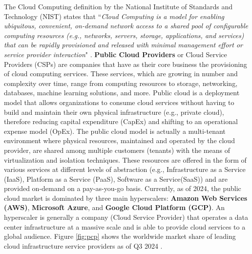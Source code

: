 The Cloud Computing definition by the National Institute of Standards and Technology (NIST) \cite{nist_cloud_computing} states that ``\textit{Cloud Computing is a model for enabling ubiquitous, convenient, on-demand network access to a shared pool of configurable computing resources (e.g., networks, servers, storage, applications, and services) that can be rapidly provisioned and released with minimal management effort or service provider interaction}" \cite{nist_cloud_computing}.
\textbf{Public Cloud Providers} or Cloud Service Providers (CSPs) are companies that have as their core business the provisioning of cloud computing services. 
These services, which are growing in number and complexity over time, range from computing resources to storage, networking, databases, machine learning solutions, and more. 
Public cloud is a deployment model that allows organizations to consume cloud services without having to build and maintain their own physical infrastructure (e.g., private cloud), therefore reducing capital expenditure (CapEx) and shifting to an operational expense model (OpEx). 
The public cloud model is actually a multi-tenant environment where physical resources, maintained and operated by the cloud provider, are shared among multiple customers (tenants) with the means of virtualization and isolation techniques.
These resources are offered in the form of various services at different levels of abstraction (e.g., Infrastructure as a Service (IaaS), Platform as a Service (PaaS), Software as a Service(SaaS)) and are provided on-demand on a pay-as-you-go basis.
Currently, as of 2024, the public cloud market is dominated by three main hyperscalers: \textbf{Amazon Web Services (AWS)}, \textbf{Microsoft Azure}, and \textbf{Google Cloud Platform (GCP)}.
An hyperscaler is generally a company (Cloud Service Provider) that operates a data center infrastructure at a massive scale and is able to provide cloud services to a global audience.
Figure \ref{fig:pcp} shows the worldwide market share of leading cloud infrastructure service providers as of Q3 2024 \cite{statista_cloud_market_share}.

